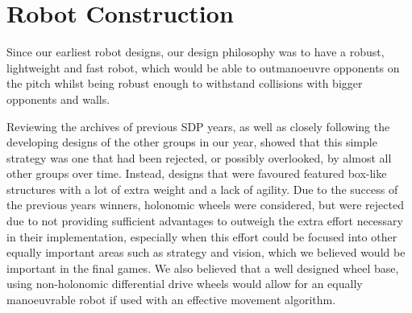 \section{Robot Construction}

Since our earliest robot designs, our design philosophy was to have a robust, lightweight and fast robot, which would be able to outmanoeuvre opponents on the pitch whilst being robust enough to withstand collisions with bigger opponents and walls. 

Reviewing the archives of previous SDP years, as well as closely following the developing designs of the other groups in our year, showed that this simple strategy was one that had been rejected, or possibly overlooked, by almost all other groups over time. Instead, designs that were favoured featured box-like structures with a lot of extra weight and a lack of agility. Due to the success of the previous years winners, holonomic wheels were considered, but were rejected due to not providing sufficient advantages to outweigh the extra effort necessary in their implementation, especially when this effort could be focused into other equally important areas such as strategy and vision, which we believed would be important in the final games. We also believed that a well designed wheel base, using non-holonomic differential drive wheels would allow for an equally manoeuvrable robot if used with an effective movement algorithm.

